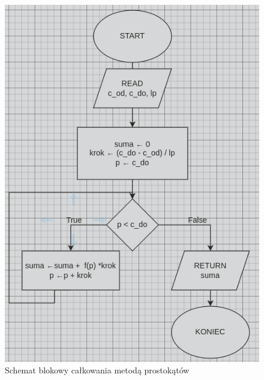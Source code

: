 \documentclass{article}
\begin{document}
\begin{figure}[H]
    \centering
    \includegraphics[width=\textwidth]{"../assets/prost.png"}
    \caption{Schemat blokowy całkowania metodą prostokątów}
    \label{fig:block_diagram_prost}
\end{figure}
\end{document}
